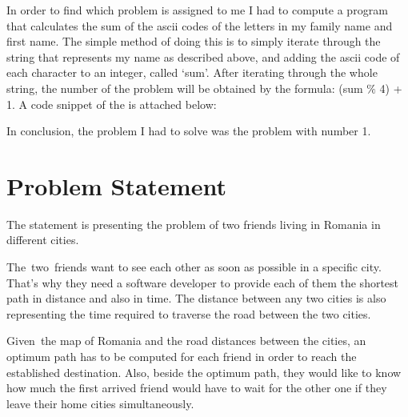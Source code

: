 \documentclass[12pt]{article}
\begin{document}

\begin{justify}
In order to find which problem is assigned to me I had to compute a program that calculates the sum of the ascii codes of the letters in my family name and first name. The simple method of doing this is to simply iterate through the string that represents my name as described above, and adding the ascii code of each character to an integer, called ‘sum’. After iterating through the whole string, the number of the problem will be obtained by the formula: (sum $\%$  4) + 1. A code snippet of the is attached below:
\end{justify}\par


\vspace{\baselineskip}
\begin{justify}
In conclusion, the problem I had to solve was the problem with number 1.
\end{justify}\par


\vspace{\baselineskip}

\vspace{\baselineskip}

\vspace{\baselineskip}
\section*{Problem Statement}
\begin{justify}
The statement is presenting the problem of two friends living in Romania in different cities. 
\end{justify}\par


\vspace{\baselineskip}
\begin{justify}
The\ two\ friends want to see each other as soon as possible in a specific city. That’s why they need a software developer to provide each of them the shortest path in distance and also in time. The distance between any two cities is also representing the time required to traverse the road between the two cities.   \tab \tab \tab \tab \tab \tab \tab 
\end{justify}\par


\vspace{\baselineskip}
\begin{justify}
Given\ the map of Romania and the road distances between the cities, an optimum path has to be computed for each friend in order to reach the established destination. Also, beside the optimum path,  they would like to know how much the first arrived friend would have to wait for the other one if they leave their home cities simultaneously.\tab \tab \tab 
\end{justify}\par
\end{document}
